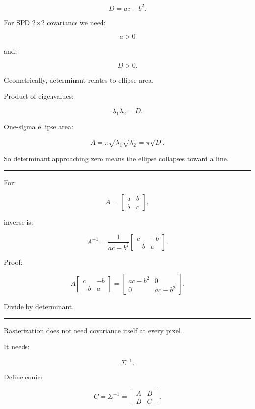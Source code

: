 \[
\boxed{
D=ac-b^2.
}
\]

For SPD 2×2 covariance we need:

\[
a>0
\]

and:

\[
D>0.
\]

Geometrically, determinant relates to ellipse area.

Product of eigenvalues:

\[
\lambda_1\lambda_2=D.
\]

One-sigma ellipse area:

\[
A=
\pi
\sqrt{\lambda_1}
\sqrt{\lambda_2}
=
\boxed{
\pi\sqrt{D}.
}
\]

So determinant approaching zero means the ellipse collapses toward a line.

\begin{center}\rule{0.5\linewidth}{0.5pt}\end{center}

For:

\[
A=
\begin{bmatrix}
a&b\\
b&c
\end{bmatrix},
\]

inverse is:

\[
\boxed{
A^{-1}
=
\frac1{ac-b^2}
\begin{bmatrix}
c&-b\\
-b&a
\end{bmatrix}.
}
\]

Proof:

\[
A
\begin{bmatrix}
c&-b\\
-b&a
\end{bmatrix}
=
\begin{bmatrix}
ac-b^2&0\\
0&ac-b^2
\end{bmatrix}.
\]

Divide by determinant.

\begin{center}\rule{0.5\linewidth}{0.5pt}\end{center}

Rasterization does not need covariance itself at every pixel.

It needs:

\[
\Sigma^{-1}.
\]

Define conic:

\[
C=
\Sigma^{-1}
=
\begin{bmatrix}
A&B\\
B&C
\end{bmatrix}.
\]

